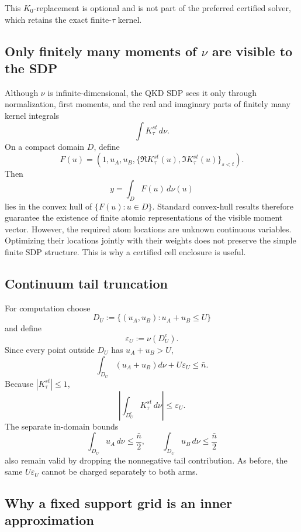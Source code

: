 \documentclass[11pt]{article}
\theoremstyle{remark}
\begin{document}
This \(K_0\)-replacement is optional and is not part of the preferred
certified solver, which retains the exact finite-\(\tau\) kernel.

\subsection{Only finitely many moments of \(\nu\) are visible to the SDP}

Although \(\nu\) is infinite-dimensional, the QKD SDP sees it only through
normalization, first moments, and the real and imaginary parts of finitely many
kernel integrals
\[
    \int K_\tau^{st}\,d\nu.
\]
On a compact domain \(D\), define
\[
    F(u)
    =
    \left(
      1,u_A,u_B,
      \{\Re K_\tau^{st}(u),\Im K_\tau^{st}(u)\}_{s<t}
    \right).
\]
Then
\[
    y=\int_DF(u)\,d\nu(u)
\]
lies in the convex hull of \(\{F(u):u\in D\}\).  Standard convex-hull results
therefore guarantee the existence of finite atomic representations of the
visible moment vector.  However, the required atom locations are unknown
continuous variables.  Optimizing their locations jointly with their weights
does not preserve the simple finite SDP structure.  This is why a certified
cell enclosure is useful.

\subsection{Continuum tail truncation}

For computation choose
\[
    D_U
    :=
    \{(u_A,u_B):u_A+u_B\le U\}
\]
and define
\[
    \varepsilon_U
    :=
    \nu(D_U^c).
\]
Since every point outside \(D_U\) has \(u_A+u_B>U\),
\begin{equation}
    \int_{D_U}(u_A+u_B)d\nu
    +
    U\varepsilon_U
    \le
    \bar n.
    \label{eq:stage3-tail-energy}
\end{equation}
Because \(|K_\tau^{st}|\le1\),
\begin{equation}
    \left|
      \int_{D_U^c}K_\tau^{st}\,d\nu
    \right|
    \le
    \varepsilon_U.
    \label{eq:stage3-tail-overlap}
\end{equation}
The separate in-domain bounds
\[
    \int_{D_U}u_A\,d\nu\le\frac{\bar n}{2},
    \qquad
    \int_{D_U}u_B\,d\nu\le\frac{\bar n}{2}
\]
also remain valid by dropping the nonnegative tail contribution.  As before,
the same \(U\varepsilon_U\) cannot be charged separately to both arms.

\subsection{Why a fixed support grid is an inner approximation}
\end{document}
